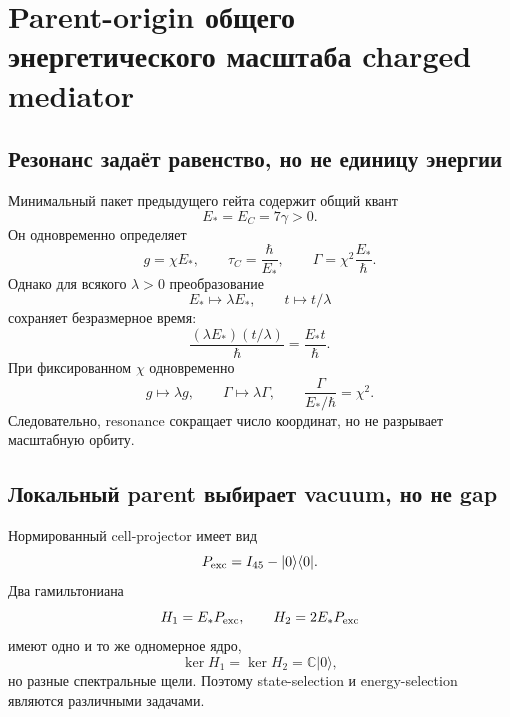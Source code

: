 \chapter{Parent-origin общего энергетического масштаба charged mediator}
\label{ch:v8-charged-mediator-common-energy-origin}

\section{Резонанс задаёт равенство, но не единицу энергии}

Минимальный пакет предыдущего гейта содержит общий квант
\begin{equation}
 E_*=E_C=7\gamma>0.
 \label{eq:v8-common-energy-identification}
\end{equation}
Он одновременно определяет
\begin{equation}
 g=\chi E_*,\qquad
 \tau_C=\frac{\hbar}{E_*},\qquad
 \Gamma=\chi^2\frac{E_*}{\hbar}.
 \label{eq:v8-common-energy-derived-data}
\end{equation}
Однако для всякого $\lambda>0$ преобразование
\begin{equation}
 E_*\mapsto\lambda E_*,\qquad
 t\mapsto t/\lambda
 \label{eq:v8-common-energy-scale-orbit}
\end{equation}
сохраняет безразмерное время:
\begin{equation}
 \frac{(\lambda E_*)(t/\lambda)}{\hbar}
 =\frac{E_*t}{\hbar}.
 \label{eq:v8-common-energy-time-invariant}
\end{equation}
При фиксированном $\chi$ одновременно
\begin{equation}
 g\mapsto\lambda g,\qquad
 \Gamma\mapsto\lambda\Gamma,\qquad
 \frac{\Gamma}{E_*/\hbar}=\chi^2.
 \label{eq:v8-common-energy-rate-orbit}
\end{equation}
Следовательно, resonance сокращает число координат, но не разрывает
масштабную орбиту.

\section{Локальный parent выбирает vacuum, но не gap}

Нормированный cell-projector имеет вид
\begin{equation}
 P_{\rm exc}=I_{45}-|0\rangle\langle0|.
 \label{eq:v8-common-energy-excitation-projector}
\end{equation}
Два гамильтониана
\begin{equation}
 H_1=E_*P_{\rm exc},
 \qquad H_2=2E_*P_{\rm exc}
 \label{eq:v8-common-energy-projector-witnesses}
\end{equation}
имеют одно и то же одномерное ядро,
\begin{equation}
 \ker H_1=\ker H_2=\mathbb C|0\rangle,
 \label{eq:v8-common-energy-same-vacuum}
\end{equation}
но разные спектральные щели. Поэтому state-selection и energy-selection
являются различными задачами.

